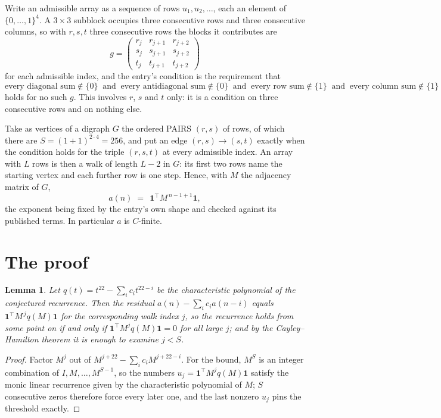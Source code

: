 \documentclass[11pt,a4paper]{article}
\theoremstyle{plain}
\newtheorem{lemma}[theorem]{Lemma}
\theoremstyle{definition}
\begin{document}
Write an admissible array as a sequence of rows $u_1,u_2,\dots$, each an element of
$\{0,\dots,1\}^{4}$. A $3\times3$ subblock occupies three consecutive rows and
three consecutive columns, so with $r,s,t$ three consecutive rows the blocks it
contributes are
\[
g=\begin{pmatrix}r_j&r_{j+1}&r_{j+2}\\ s_j&s_{j+1}&s_{j+2}\\ t_j&t_{j+1}&t_{j+2}\end{pmatrix}
\]
for each admissible index, and the entry's condition is the requirement that
\[
\text{every diagonal sum} \notin \{0\}\ \text{ and }\ \text{every antidiagonal sum} \notin \{0\}\ \text{ and }\ \text{every row sum} \notin \{1\}\ \text{ and }\ \text{every column sum} \notin \{1\}
\]
holds for no such $g$. This involves $r$, $s$ and $t$ only: it is a condition on
three consecutive rows and on nothing else.

Take as vertices of a digraph $G$ the ordered PAIRS $(r,s)$ of rows, of which there are
$S=(1+1)^{2\cdot4}=256$, and put an edge $(r,s)\to(s,t)$ exactly when the condition
holds for the triple $(r,s,t)$ at every admissible index. An array with $L$ rows is then a
walk of length $L-2$ in $G$: its first two rows name the starting vertex and each further
row is one step. Hence, with $M$ the adjacency matrix of $G$,
\[
a(n)\;=\;\,\mathbf{1}^{\!\top}M^{\,n-1+1}\mathbf{1},
\]
the exponent being fixed by the entry's own shape and checked against its published terms.
In particular $a$ is $C$-finite.

\section{The proof}

\begin{lemma}\label{lem:crit}
Let $q(t)=t^{22}-\sum_i c_it^{22-i}$ be the characteristic polynomial of the
conjectured recurrence. Then the residual $a(n)-\sum_ic_ia(n-i)$ equals
$\mathbf{1}^{\!\top}M^{\,j}q(M)\mathbf{1}$ for the corresponding walk index
$j$, so the recurrence holds from some point on if and only if
$\mathbf{1}^{\!\top}M^{j}q(M)\mathbf{1}=0$ for all large $j$; and by the
Cayley--Hamilton theorem it is enough to examine $j<S$.
\end{lemma}

\begin{proof}
Factor $M^{j}$ out of $M^{j+22}-\sum_ic_iM^{j+22-i}$. For the bound, $M^{S}$
is an integer combination of $I,M,\dots,M^{S-1}$, so the numbers
$u_j=\mathbf{1}^{\!\top}M^{j}q(M)\mathbf{1}$ satisfy the monic linear recurrence given by
the characteristic polynomial of $M$; $S$ consecutive zeros therefore force every later one,
and the last nonzero $u_j$ pins the threshold exactly.
\end{proof}
\end{document}
